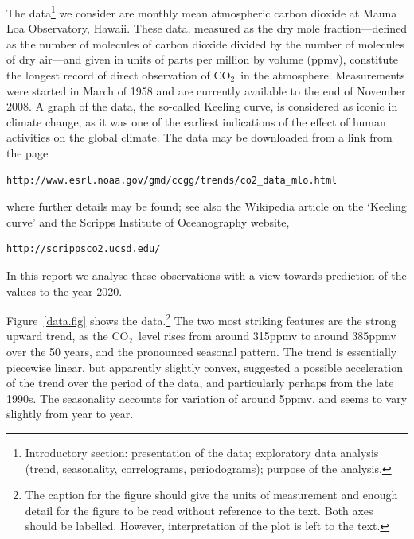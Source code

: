 \documentclass[a4paper,11pt]{article}\usepackage[]{graphicx}\usepackage[]{color}
\def\CO{{CO$_{2}$}}
\begin{document}
The data\footnote{Introductory section:   presentation of the data; exploratory data analysis (trend,  
seasonality, correlograms, periodograms); purpose of the analysis.}  we consider are monthly mean atmospheric carbon dioxide at Mauna Loa Observatory, Hawaii.  These data, measured as the dry mole fraction---defined as the number of molecules of carbon dioxide divided by the number of molecules of dry air---and given in units of parts per million by volume  (ppmv), constitute the longest record of direct observation of \CO\  in the atmosphere. Measurements were started in March of 1958 and are currently available to the end of November 2008.  A graph of the data, the so-called Keeling curve, is considered as iconic in climate change, as it was one of the earliest indications of the effect of human activities on the global climate.  The data may be downloaded from a link from the page
\begin{verbatim}
http://www.esrl.noaa.gov/gmd/ccgg/trends/co2_data_mlo.html
\end{verbatim}
where further details may be found; see also the Wikipedia article on the `Keeling curve' and the Scripps Institute of Oceanography website, \begin{verbatim}
http://scrippsco2.ucsd.edu/
\end{verbatim}
In this report we analyse these observations with a view towards prediction of the values to the year 2020.



Figure~\ref{data.fig} shows the data.\footnote{The caption for the figure should give the units of measurement and enough detail for the figure to be read without reference to the text. Both axes should be labelled.  However, interpretation of the plot is left to the text.}  The two most striking features are the strong upward trend, as the \CO\  level rises from around 315ppmv to around 385ppmv over the 50 years, and the pronounced seasonal pattern.  The trend is essentially piecewise linear, but apparently slightly convex, suggested a possible acceleration of the trend over the period of the data, and particularly perhaps from the late 1990s.  The seasonality accounts for variation of around 5ppmv, and seems to vary slightly from year to year. 
\end{document}
